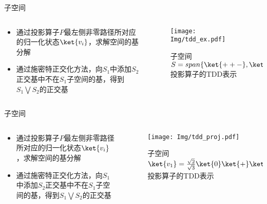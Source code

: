 \documentclass[aspectratio=1610]{ctexbeamer}
\begin{document}
\begin{frame}{子空间}
    \begin{columns} %
        \begin{column}{.6\textwidth}
            \begin{itemize}
                \item 通过投影算子$P$最左侧非零路径所对应的归一化状态\(\ket{v_i}\)，求解空间的基分解
                \item 通过施密特正交化方法，向$S_1$中添加$S_2$正交基中不在$S_1$子空间的基，得到$S_1\bigvee S_2$的正交基
            \end{itemize}
        \end{column}
        \begin{column}{.4\textwidth}
            \begin{figure}
                \centering
                \texttt{[image: Img/tdd\_ex.pdf]}
                \caption{子空间$S=span\{\ket{++-},\ket{11-}\}$投影算子的TDD表示}
            \end{figure}
        \end{column}
    \end{columns}
\end{frame}
\begin{frame}{子空间}
    \begin{columns} %
        \begin{column}{.6\textwidth}
            \begin{itemize}
                \item 通过投影算子$P$最左侧非零路径所对应的归一化状态\(\ket{v_i}\)，求解空间的基分解
                \item 通过施密特正交化方法，向$S_1$中添加$S_2$正交基中不在$S_1$子空间的基，得到$S_1\bigvee S_2$的正交基
            \end{itemize}
        \end{column}
        \begin{column}{.4\textwidth}
            \begin{figure}
                \centering
                \texttt{[image: Img/tdd\_proj.pdf]}
                \caption{子空间$\ket{v_1}=\frac{\sqrt{2}}{\sqrt{3}}\ket{0}\ket{+}\ket{-}+\frac{1}{\sqrt{3}}\ket{1}\ket{0}\ket{-}$投影算子的TDD表示}
            \end{figure}
        \end{column}
    \end{columns}
\end{frame}
\end{document}

